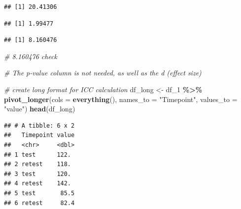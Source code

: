 \documentclass[
]{article}
\newenvironment{Shaded}{\begin{snugshade}}{\end{snugshade}}
\newcommand{\AttributeTok}[1]{\textcolor[rgb]{0.13,0.29,0.53}{#1}}
\newcommand{\CommentTok}[1]{\textcolor[rgb]{0.56,0.35,0.01}{\textit{#1}}}
\newcommand{\ConstantTok}[1]{\textcolor[rgb]{0.56,0.35,0.01}{#1}}
\newcommand{\FunctionTok}[1]{\textcolor[rgb]{0.13,0.29,0.53}{\textbf{#1}}}
\newcommand{\NormalTok}[1]{#1}
\newcommand{\OtherTok}[1]{\textcolor[rgb]{0.56,0.35,0.01}{#1}}
\newcommand{\SpecialCharTok}[1]{\textcolor[rgb]{0.81,0.36,0.00}{\textbf{#1}}}
\newcommand{\StringTok}[1]{\textcolor[rgb]{0.31,0.60,0.02}{#1}}
\begin{document}
\begin{verbatim}
## [1] 20.41306
\end{verbatim}

\begin{Shaded}
\end{Shaded}

\begin{verbatim}
## [1] 1.99477
\end{verbatim}

\begin{Shaded}
\end{Shaded}

\begin{verbatim}
## [1] 8.160476
\end{verbatim}

\begin{Shaded}
\begin{Highlighting}[]
\CommentTok{\# 8.160476 check}

\CommentTok{\# The p{-}value column is not needed, as well as the d (effect size)}

\CommentTok{\# create long format for ICC calculation}
\NormalTok{df\_long }\OtherTok{\textless{}{-}}\NormalTok{ df\_1 }\SpecialCharTok{\%\textgreater{}\%}
  \FunctionTok{pivot\_longer}\NormalTok{(}\AttributeTok{cols =} \FunctionTok{everything}\NormalTok{(), }\AttributeTok{names\_to =} \StringTok{"Timepoint"}\NormalTok{, }\AttributeTok{values\_to =} \StringTok{"value"}\NormalTok{) }
\FunctionTok{head}\NormalTok{(df\_long)}
\end{Highlighting}
\end{Shaded}

\begin{verbatim}
## # A tibble: 6 x 2
##   Timepoint value
##   <chr>     <dbl>
## 1 test      122. 
## 2 retest    118. 
## 3 test      120. 
## 4 retest    142. 
## 5 test       85.5
## 6 retest     82.4
\end{verbatim}
\end{document}
